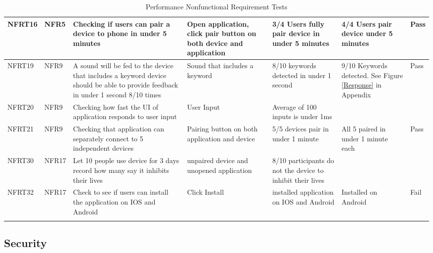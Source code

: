 \documentclass[12pt, titlepage]{article}
\begin{document}
\begin{longtable}{|p{1.4cm}|p{1.1cm}|p{2.5cm}|p{1.5cm}|p{2.2cm}|p{1.9cm}|p{1.2cm}|}
  NFRT16       & NFR5          & Checking if users can pair a device to phone in under 5 minutes  & Open application, click pair button on both device and application& 3/4 Users fully pair device in under 5 minutes& 4/4 Users pair device under 5 minutes&{\color[HTML]{32CB00} Pass}            \\ \hline
  NFRT19       & NFR9          & A sound will be fed to the device that includes a keyword device should be able to provide feedback in under 1 second 8/10 times& Sound that includes a keyword&8/10 keywords detected in under 1 second& 9/10 Keywords detected. See Figure \ref*{Response} in Appendix&{\color[HTML]{32CB00} Pass}         \\ \hline
  NFRT20       & NFR9          & Checking how fast the UI of application responds to user input   &User Input & Average of 100 inputs is under 1ms&                                                                                             & \cellcolor[HTML]{FFFFFF}{\color[HTML]{F8A102} TBD}  \\ \hline
  NFRT21       & NFR9          & Checking that application can separately connect to 5 independent devices&Pairing button on both application and device& 5/5 devices pair in under 1 minute & All 5 paired in under 1 minute each              &{\color[HTML]{32CB00} Pass}                          \\ \hline           
  NFRT30       & NFR17         & Let 10 people use device for 3 days record how many say it inhibits their lives &unpaired device and unopened application & 8/10 participants do not the device to inhibit their lives &                       &\cellcolor[HTML]{FFFFFF}{\color[HTML]{F8A102} TBD}    \\ \hline           
  NFRT32       & NFR17         & Check to see if users can install the application on IOS and Android& Click Install & installed application on IOS and Android&Installed on Android          &{\color[HTML]{FE0000} Fail}                                                       \\ \hline
  \caption{Performance Nonfunctional Requirement Tests}
  \label{performanceNonfunctionalRequirementTests}
\end{longtable}

\newpage
\subsection{Security}
\end{document}
